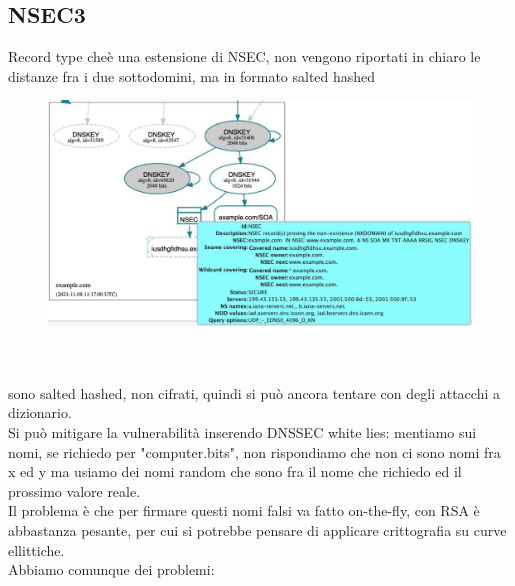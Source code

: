 \documentclass[12pt, oneside]{extbook} %
\begin{document}
\subsection{NSEC3}
Record type cheè una estensione di NSEC, non vengono riportati in chiaro le distanze fra i due sottodomini, ma in formato salted hashed\\ 
\begin{figure}[h!]
    \centering
    \includegraphics[scale=0.5]{../../immagini/nsec3_sh}
\end{figure}\\\\
sono salted hashed, non cifrati, quindi si può ancora tentare con degli attacchi a dizionario.
\\Si può mitigare la vulnerabilità inserendo DNSSEC white lies: mentiamo sui nomi, se richiedo per "computer.bits", non rispondiamo che non ci sono nomi fra x ed y ma usiamo dei nomi random che sono fra il nome che richiedo ed il prossimo valore reale.
\\Il problema è che per firmare questi nomi falsi va fatto on-the-fly, con RSA è abbastanza pesante, per cui  si potrebbe pensare di applicare crittografia su curve ellittiche.
\\Abbiamo comunque dei problemi: 
\end{document}
